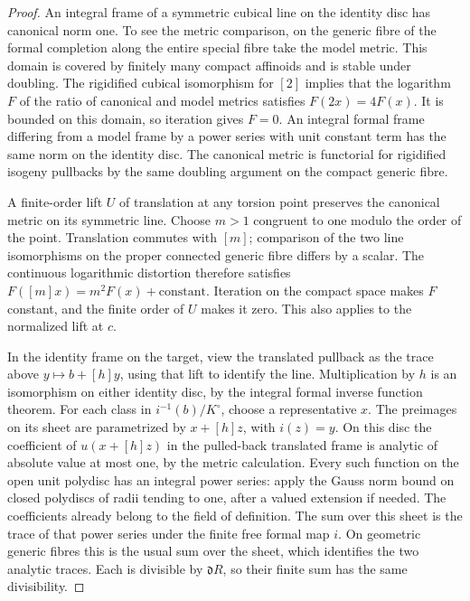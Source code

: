 \begin{proof}
An integral frame of a symmetric cubical line on the identity disc
has canonical norm one. To see the metric comparison, on the generic
fibre of the formal completion along the entire special fibre take
the model metric. This domain is covered by finitely many compact
affinoids and is stable under doubling. The rigidified cubical
isomorphism for \([2]\) implies that the logarithm \(F\) of the
ratio of canonical and model metrics satisfies \(F(2x)=4F(x)\).
It is bounded on this domain, so iteration gives \(F=0\).
An integral formal frame differing from a model frame by a power
series with unit constant term has the same norm on the identity
disc. The canonical metric is functorial for rigidified isogeny
pullbacks by the same doubling argument on the compact generic
fibre.

A finite-order lift \(U\) of translation at any torsion point
preserves the canonical metric on its symmetric line. Choose
\(m>1\) congruent to one modulo the order of the point. Translation
commutes with \([m]\); comparison of the two line isomorphisms
on the proper connected generic fibre differs by a scalar.
The continuous logarithmic distortion therefore satisfies
\(F([m]x)=m^2F(x)+\mathrm{constant}\). Iteration on the compact
space makes \(F\) constant, and the finite order of \(U\) makes it
zero. This also applies to the normalized lift at \(c\).

In the identity frame on the target, view the translated pullback
as the trace above \(y\mapsto b+[h]y\), using that lift to identify
the line. Multiplication by \(h\) is an isomorphism on either
identity disc, by the integral formal inverse function theorem.
For each class in \(i^{-1}(b)/K^\circ\), choose a representative
\(x\). The preimages on its sheet are parametrized by
\(x+[h]z\), with \(i(z)=y\). On this disc the coefficient of
\(u(x+[h]z)\) in the pulled-back translated frame is analytic of
absolute value at most one, by the metric calculation. Every such
function on the open unit polydisc has an integral power series:
apply the Gauss norm bound on closed polydiscs of radii tending to
one, after a valued extension if needed. The coefficients already
belong to the field of definition. The sum over this sheet is the
trace of that power series under the finite free formal map \(i\).
On geometric generic fibres this is the usual sum over the sheet,
which identifies the two analytic traces. Each is divisible by
\(\mathfrak d R\), so their finite sum has the same divisibility.
\end{proof}

